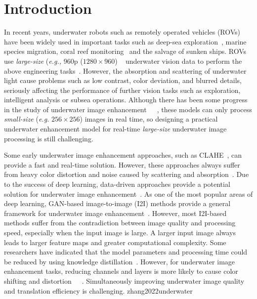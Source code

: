\documentclass[utf8]{FrontiersinHarvard} %
\begin{document}
\section{Introduction}

In recent years, underwater robots such as remotely operated vehicles (ROVs) have been widely used in important tasks such as deep-sea exploration~\citep{whitcomb2000advances}, marine species migration, coral reef monitoring~\citep{6385685} and the salvage of sunken ships. ROVs use \textit{large-size} (\textit{e.g.,} 960p ($1280\times960$) ~\citep{goodman2003development} underwater vision data to perform the above engineering tasks~\citep{2016Ship}. However, the absorption and scattering of underwater light cause problems such as low contrast, color deviation, and blurred details, seriously affecting the performance of further vision tasks such as exploration, intelligent analysis or subsea operations. Although there has been some progress in the study of underwater image enhancement~\citep{8460552}~\citep{9001231}~\citep{naik2021shallow}, these models can only process \textit{small-size} (\textit{e.g.} $256\times256$) images in real time, so designing a practical underwater enhancement model for real-time \textit{large-size} underwater image processing is still challenging.

Some early underwater image enhancement approaches, such as CLAHE~\citep{109340}, can provide a fast and real-time solution. However, these approaches always suffer from heavy color distortion and noise caused by scattering and absorption~\citep{lu2017underwater}. Due to the success of deep learning, data-driven approaches provide a potential solution for underwater image enhancement~\citep{naik2021shallow,2019Underwater1}. As one of the most popular areas of deep learning, GAN-based image-to-image (I2I) methods provide a general framework for underwater image enhancement~\citep{9001231}. However, most I2I-based methods suffer from the contradiction between image quality and processing speed, especially when the input image is large. A larger input image always leads to larger feature maps and greater computational complexity. Some researchers have indicated that the model parameters and processing time could be reduced by using knowledge distillation~\citep{ren2021online}. However, for underwater image enhancement tasks, reducing channels and layers is more likely to cause color shifting and distortion~\citep{2020Underwater}~\citep{guo2019underwater}~\citep{zhuang2021retinex}. Simultaneously improving underwater image quality and translation efficiency is challenging. zhang2022underwater
\end{document}
